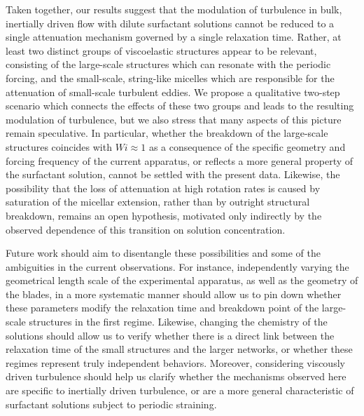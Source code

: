 \documentclass[aps,prfluids,groupedaddress,showkeys,11pt,tightenlines]{revtex4-2}
\begin{document}
Taken together, our results suggest that the modulation of turbulence in bulk, inertially driven flow with dilute surfactant solutions cannot be reduced to a single attenuation mechanism governed by a single relaxation time. Rather, at least two distinct groups of viscoelastic structures appear to be relevant, consisting of the large-scale structures which can resonate with the periodic forcing, and the small-scale, string-like micelles which are responsible for the attenuation of small-scale turbulent eddies. We propose a qualitative two-step scenario which connects the effects of these two groups and leads to the resulting modulation of turbulence, but we also stress that many aspects of this picture remain speculative. In particular, whether the breakdown of the large-scale structures coincides with $Wi \approx 1$ as a consequence of the specific geometry and forcing frequency of the current apparatus, or reflects a more general property of the surfactant solution, cannot be settled with the present data. Likewise, the possibility that the loss of attenuation at high rotation rates is caused by saturation of the micellar extension, rather than by outright structural breakdown, remains an open hypothesis, motivated only indirectly by the observed dependence of this transition on solution concentration.

Future work should aim to disentangle these possibilities and some of the ambiguities in the current observations. For instance, independently varying the geometrical length scale of the experimental apparatus, as well as the geometry of the blades, in a more systematic manner should allow us to pin down whether these parameters modify the relaxation time and breakdown point of the large-scale structures in the first regime. Likewise, changing the chemistry of the solutions should allow us to verify whether there is a direct link between the relaxation time of the small structures and the larger networks, or whether these regimes represent truly independent behaviors. Moreover, considering viscously driven turbulence should help us clarify whether the mechanisms observed here are specific to inertially driven turbulence, or are a more general characteristic of surfactant solutions subject to periodic straining.

\end{document}

